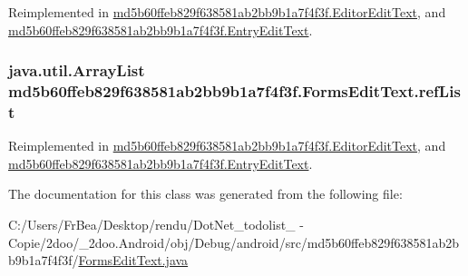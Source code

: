 Reimplemented in \hyperlink{classmd5b60ffeb829f638581ab2bb9b1a7f4f3f_1_1_editor_edit_text_c38db1db19f69806cc1b75f1a04cebda}{md5b60ffeb829f638581ab2bb9b1a7f4f3f.EditorEditText}, and \hyperlink{classmd5b60ffeb829f638581ab2bb9b1a7f4f3f_1_1_entry_edit_text_2ad10bc93868a1a331ee5c3f0f6447b6}{md5b60ffeb829f638581ab2bb9b1a7f4f3f.EntryEditText}.\hypertarget{classmd5b60ffeb829f638581ab2bb9b1a7f4f3f_1_1_forms_edit_text_e4cf7e6b7330b3bf927c0a23059cf810}{
\subsubsection[{refList}]{\setlength{\rightskip}{0pt plus 5cm}java.util.ArrayList {\bf md5b60ffeb829f638581ab2bb9b1a7f4f3f.FormsEditText.refList}}}
\label{classmd5b60ffeb829f638581ab2bb9b1a7f4f3f_1_1_forms_edit_text_e4cf7e6b7330b3bf927c0a23059cf810}




Reimplemented in \hyperlink{classmd5b60ffeb829f638581ab2bb9b1a7f4f3f_1_1_editor_edit_text_c9c34d4a7a109014d9c3e0fcb9d24cd4}{md5b60ffeb829f638581ab2bb9b1a7f4f3f.EditorEditText}, and \hyperlink{classmd5b60ffeb829f638581ab2bb9b1a7f4f3f_1_1_entry_edit_text_3919b30a60433804ec3826c0a1cafe36}{md5b60ffeb829f638581ab2bb9b1a7f4f3f.EntryEditText}.

The documentation for this class was generated from the following file:\begin{CompactItemize}
\item 
C:/Users/FrBea/Desktop/rendu/DotNet\_\-todolist\_ - Copie/2doo/\_\-2doo.Android/obj/Debug/android/src/md5b60ffeb829f638581ab2bb9b1a7f4f3f/\hyperlink{_forms_edit_text_8java}{FormsEditText.java}\end{CompactItemize}
